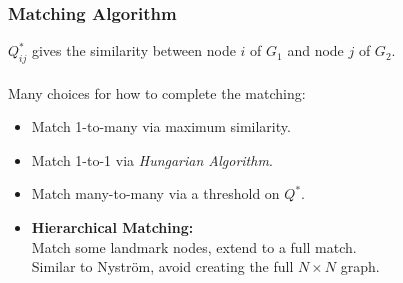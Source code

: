 \documentclass{beamer}
\begin{document}
\begin{frame}
  \frametitle{Matching Algorithm}
  $Q^*_{ij}$ gives the similarity between node $i$ of $G_1$ and node $j$ of $G_2$. \\~\\
  Many choices for how to complete the matching:
  \begin{itemize}
  \item Match 1-to-many via maximum similarity.
  \item Match 1-to-1 via \emph{Hungarian Algorithm}.
  \item Match many-to-many via a threshold on $Q^*$.
  \item \textbf{Hierarchical Matching:}\\
    Match some landmark nodes, extend to a full match.\\
    Similar to Nystr\"{o}m, avoid creating the full $N\times N$ graph.
  \end{itemize}
\end{frame}


\end{document}
